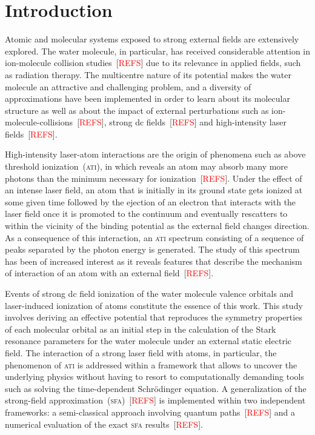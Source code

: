 \chapter{Introduction}
\label{cha:introduction}


Atomic and molecular systems exposed to strong external fields are
extensively explored.
The water molecule, in particular, has received considerable attention
in ion-molecule collision studies~[\textcolor{red}{REFS}] due to its
relevance in applied fields, such as radiation therapy. The
multicentre nature of its potential makes the water molecule an
attractive and challenging problem, and a diversity of approximations
have been implemented in order to learn about its molecular structure
as well as about the impact of external perturbations such as
ion-molecule-collisions~[\textcolor{red}{REFS}], strong dc
fields~[\textcolor{red}{REFS}] and high-intensity laser
fields~[\textcolor{red}{REFS}].

High-intensity laser-atom interactions are the origin of phenomena
such as above threshold ionization~(\textsc{ati}), in which reveals an
atom may absorb many more photons than the minimum necessary for
ionization~[\textcolor{red}{REFS}].
Under the effect of an intense laser field, an atom that is initially
in its ground state gets ionized at some given time followed by the
ejection of an electron that interacts with the laser field once it is
promoted to the continuum and eventually rescatters to within the
vicinity of the binding potential as the external field changes
direction. As a consequence of this interaction, an \textsc{ati}
spectrum consisting of a sequence of peaks separated by the photon
energy is generated. The study of this spectrum has been of increased
interest as it reveals features that describe the mechanism of
interaction of an atom with an external field~[\textcolor{red}{REFS}].

Events of strong dc field ionization of the water molecule valence
orbitals and laser-induced ionization of atoms constitute the essence
of this work. This study involves deriving an effective potential that
reproduces the symmetry properties of each molecular orbital as an
initial step in the calculation of the Stark resonance parameters for
the water molecule under an external static electric field.
The interaction of a strong laser field with atoms, in particular, the
phenomenon of \textsc{ati} is addressed within a framework that allows
to uncover the underlying physics without having to resort to
computationally demanding tools such as solving the time-dependent
Schr\"{o}dinger equation. A generalization of the strong-field
approximation~(\textsc{sfa})~[\textcolor{red}{REFS}] is implemented
within two independent frameworks: a semi-classical approach involving
quantum paths~[\textcolor{red}{REFS}] and a numerical evaluation of
the exact \textsc{sfa} results~[\textcolor{red}{REFS}].


